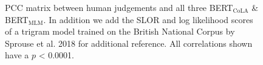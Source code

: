 \begin{figure}[h]
    \caption[PCC matrix between human judgements, BERT$_{\mathrm{CoLA}}$,\newline BERT$_{\mathrm{MLM}}$, and a trigram model]{PCC matrix between human judgements and all three BERT$_{\mathrm{CoLA}}$ \& BERT$_{\mathrm{MLM}}$.  In addition we add the SLOR and log likelihood scores of a trigram model trained on the British National Corpus by Sprouse et al. 2018 for additional reference.  All correlations shown have a $p$ < 0.0001.}
    \label{fig:bert_acc_pll_delta_correlation_matrix}
\end{figure}

